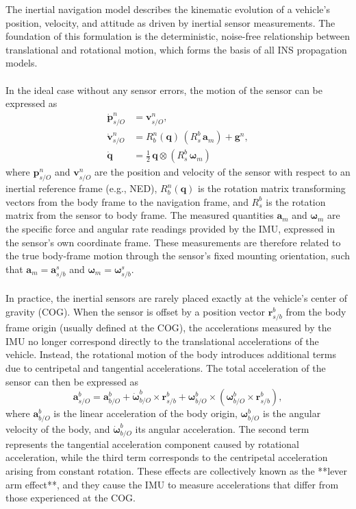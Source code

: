 The inertial navigation model describes the kinematic evolution of a vehicle’s position, velocity, and attitude as driven by inertial sensor measurements. The foundation of this formulation is the deterministic, noise-free relationship between translational and rotational motion, which forms the basis of all INS propagation models.  
\\ \\
In the ideal case without any sensor errors, the motion of the sensor can be expressed as
$$
\begin{aligned}
    \dot{\mathbf{p}}_{s/O}^{n} &= \mathbf{v}_{s/O}^{n}, \\
    \dot{\mathbf{v}}_{s/O}^{n} &= R_b^n(\mathbf{q})\,(R_s^b\,\mathbf{a}_m) + \mathbf{g}^n, \\
    \dot{\mathbf{q}} &= \tfrac{1}{2}\,\mathbf{q} \otimes (R_s^b\,\boldsymbol{\omega}_m)
\end{aligned}
$$
where $\mathbf{p}_{s/O}^{n}$ and $\mathbf{v}_{s/O}^{n}$ are the position and velocity of the sensor with respect to an inertial reference frame (e.g., NED), $R_b^n(\mathbf{q})$ is the rotation matrix transforming vectors from the body frame to the navigation frame, and $R_s^b$ is the rotation matrix from the sensor to body frame. The measured quantities $\mathbf{a}_m$ and $\boldsymbol{\omega}_m$ are the specific force and angular rate readings provided by the IMU, expressed in the sensor’s own coordinate frame. These measurements are therefore related to the true body-frame motion through the sensor’s fixed mounting orientation, such that $\mathbf{a}_m = \mathbf{a}_{s/b}^{s}$ and $\boldsymbol{\omega}_m = \boldsymbol{\omega}_{s/b}^{s}$.  
\\ \\
In practice, the inertial sensors are rarely placed exactly at the vehicle’s center of gravity (COG). When the sensor is offset by a position vector $\mathbf{r}_{s/b}^{b}$ from the body frame origin (usually defined at the COG), the accelerations measured by the IMU no longer correspond directly to the translational accelerations of the vehicle. Instead, the rotational motion of the body introduces additional terms due to centripetal and tangential accelerations. The total acceleration of the sensor can then be expressed as
$$
\mathbf{a}_{s/O}^{b} = \mathbf{a}_{b/O}^{b} + \dot{\boldsymbol{\omega}}_{b/O}^{b} \times \mathbf{r}_{s/b}^{b} + \boldsymbol{\omega}_{b/O}^{b} \times (\boldsymbol{\omega}_{b/O}^{b} \times \mathbf{r}_{s/b}^{b}),
$$
where $\mathbf{a}_{b/O}^{b}$ is the linear acceleration of the body origin, $\boldsymbol{\omega}_{b/O}^{b}$ is the angular velocity of the body, and $\dot{\boldsymbol{\omega}}_{b/O}^{b}$ its angular acceleration. The second term represents the tangential acceleration component caused by rotational acceleration, while the third term corresponds to the centripetal acceleration arising from constant rotation. These effects are collectively known as the **lever arm effect**, and they cause the IMU to measure accelerations that differ from those experienced at the COG.  
